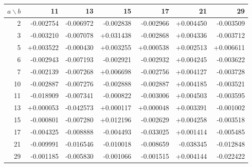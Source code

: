 \begin{tabular}{rrrrrrr}
\toprule $a\backslash b$ & 11 & 13 & 15 & 17 & 21 & 29\\\midrule
2 & -0.002754 & -0.006972 & -0.002838 & -0.002966 & +0.004450 & -0.003509\\
3 & -0.003210 & -0.007078 & +0.031438 & -0.002868 & +0.004336 & -0.003712\\
5 & +0.003522 & -0.000430 & +0.003255 & +0.000538 & +0.002513 & +0.006611\\
6 & -0.002943 & -0.007193 & -0.002921 & -0.002932 & +0.004245 & -0.003622\\
7 & -0.002139 & -0.007268 & +0.006698 & -0.002756 & +0.004127 & -0.003728\\
10 & -0.002887 & -0.007276 & -0.002888 & -0.002887 & +0.004185 & -0.003521\\
11 & -0.018909 & -0.007341 & -0.000822 & -0.003006 & +0.004503 & -0.003595\\
13 & +0.000053 & -0.042573 & +0.000117 & +0.000048 & +0.003391 & -0.001002\\
15 & -0.000801 & -0.007280 & +0.012196 & -0.002629 & +0.004258 & -0.003518\\
17 & -0.004325 & -0.008888 & -0.004493 & -0.033025 & +0.001414 & -0.005485\\
21 & -0.009991 & -0.016546 & -0.010018 & -0.008659 & -0.038345 & -0.012848\\
29 & -0.001185 & -0.005830 & -0.001066 & -0.001515 & +0.004144 & -0.022422\\
\bottomrule
\end{tabular}
